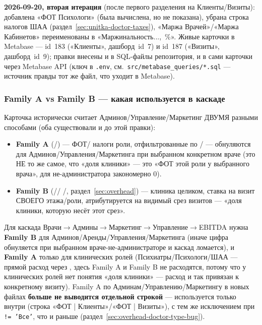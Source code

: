 \documentclass[11pt,a4paper]{article}
\begin{document}
\textbf{2026-09-20, вторая итерация} (после первого разделения на
Клиенты/Визиты): добавлена «ФОТ Психологи» (была вычислена, но не
показана), убрана строка налогов ШАА (раздел~\ref{sec:unitka-doctor-taxes}),
«Маржа Врачей»/«Маржа Кабинетов» переименованы в «Маржинальность...,~\%».
Живые карточки в Metabase --- id~183 («Клиенты», дашборд~id~7) и id~187
(«Визиты», дашборд~id~9); правки внесены и в SQL-файлы репозитория, и в
сами карточки через Metabase API (ключ \texttt{} в
\texttt{.env}, см.\ \texttt{src/metabase\_queries/*.sql} --- источник правды тот
же файл, что уходит в Metabase).

\subsubsection{Family A vs Family B --- какая используется в каскаде}

Карточка исторически считает Админов/Управление/Маркетинг ДВУМЯ разными
способами (оба существовали и до этой правки):
\begin{itemize}[leftmargin=*]
\item \textbf{Family A} (\texttt{}/\texttt{}) --- ФОТ/
  налоги роли, отфильтрованные по \texttt{}/\texttt{}
  --- обнуляются для Админов/Управления/Маркетинга при выбранном
  конкретном враче (это НЕ то же самое, что «доля клиники» --- это «ФОТ
  этой роли у выбранного врача», для не-администратора закономерно 0).
\item \textbf{Family B} (\texttt{}/\texttt{}/
  \texttt{}/\texttt{}, раздел~\ref{sec:overhead})
  --- клиника целиком, ставка на визит СВОЕГО этажа/роли, атрибутируется
  на видимый срез визитов --- «доля клиники, которую несёт этот срез».
\end{itemize}

Для каскада Врачи$\to$Админы$\to$Маркетинг$\to$Управление$\to$EBITDA нужна
\textbf{Family B} для Админов/Аренды/Управления/Маркетинга (иначе цифра
обнуляется при выбранном враче-не-администраторе и каскад ломается), и
\textbf{Family A} только для клинических ролей (Психиатры/Психологи/ШАА
--- прямой расход через \texttt{}, здесь Family A и
Family B не расходятся, потому что у клинических ролей нет понятия
«доля клиники» --- расход и так привязан к конкретному визиту).
Family A по Админам/Управлению/Маркетингу в новых файлах \textbf{больше не
выводится отдельной строкой} --- используется только внутри
\texttt{} (строка «ФОТ | Клиенты»/«ФОТ | Визиты»), с тем же
исключением при \texttt{ != 'Все'}, что и раньше
(раздел~\ref{sec:overhead-doctor-type-bug}).
\end{document}
